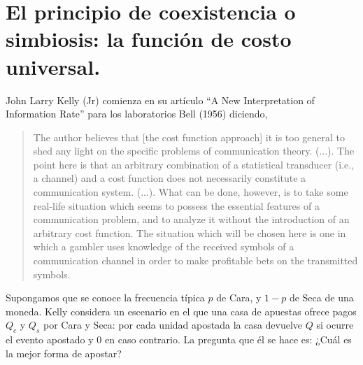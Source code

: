 \documentclass[a4paper,10pt]{book}
\theoremstyle{definition}1
\newif\ifen
\newif\ifes
\newcommand{\en}[1]{\ifen#1\fi}
\newcommand{\es}[1]{\ifes#1\fi}
\newcommand{\Ee}{\en{s}\es{e}}
\begin{document}
\es{Cuando el grupo tiene tamaño 1, la estrategia óptima es $\Ee^*=p$. }%
\es{Pero apenas surge la cooperación aparece una ventaja a favor de las estrategias especialistas $\Ee^* > p = 0.71$. }%
%
\es{Cuanto más grande son los grupos, más especialista es vuelve la estrategia óptima. }%
%
\en{At the extremes (cooperative groups of infinite size) the optimal strategy is reached at the maximum level of specialization, $\Ee=1$. }%
\es{En el extremos (grupos cooperativos de tamaño inifinito) la estrategia óptima se alcanza con el nivel de especialización máximo, $\Ee=1$. }%
%
\es{Aquí mostramos que, una vez que la cooperación emerge, las estrategias individualmente mal adaptadas al ambiente (especialistas) consigen superar tanto a las estrategias bien adaptas individualmemte (generalistas), como a sus grupos cooperativos de tamaño infinito. }%

\section{El principio de coexistencia o simbiosis: la función de costo universal.}

John Larry Kelly (Jr) comienza en su artículo ``A New Interpretation of Information Rate'' para los laboratorios Bell (1956) diciendo, 

\begin{quotation}
The author believes that [the cost function approach] it is too general to shed any light on the specific problems of communication theory. (...). The point here is that an arbitrary combination of a statistical transducer (i.e., a channel) and a cost function does not necessarily constitute a communication system. (...). What can be done, however, is to take some real-life situation which seems to possess the essential features of a communication problem, and to analyze it without the introduction of an arbitrary cost function. The situation which
will be chosen here is one in which a gambler uses knowledge of the received symbols of a communication channel in order to make profitable bets on the transmitted symbols.
\end{quotation}

Supongamos que se conoce la frecuencia típica $p$ de Cara, y $1-p$ de Seca de una moneda.
%
Kelly considera un escenario en el que una casa de apuestas ofrece pagos $Q_c$ y $Q_s$ por Cara y Seca: por cada unidad apostada la casa devuelve $Q$ si ocurre el evento apostado y $0$ en caso contrario.
%
La pregunta que él se hace es: ¿Cuál es la mejor forma de apostar?
\end{document}
